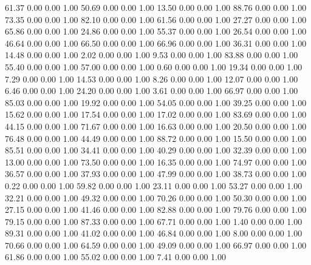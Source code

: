    61.37   0.00   0.00   1.00
   50.69   0.00   0.00   1.00
   13.50   0.00   0.00   1.00
   88.76   0.00   0.00   1.00
   73.35   0.00   0.00   1.00
   82.10   0.00   0.00   1.00
   61.56   0.00   0.00   1.00
   27.27   0.00   0.00   1.00
   65.86   0.00   0.00   1.00
   24.86   0.00   0.00   1.00
   55.37   0.00   0.00   1.00
   26.54   0.00   0.00   1.00
   46.64   0.00   0.00   1.00
   66.50   0.00   0.00   1.00
   66.96   0.00   0.00   1.00
   36.31   0.00   0.00   1.00
   14.48   0.00   0.00   1.00
    2.02   0.00   0.00   1.00
    9.53   0.00   0.00   1.00
   83.88   0.00   0.00   1.00
   55.40   0.00   0.00   1.00
   57.00   0.00   0.00   1.00
    0.60   0.00   0.00   1.00
   19.34   0.00   0.00   1.00
    7.29   0.00   0.00   1.00
   14.53   0.00   0.00   1.00
    8.26   0.00   0.00   1.00
   12.07   0.00   0.00   1.00
    6.46   0.00   0.00   1.00
   24.20   0.00   0.00   1.00
    3.61   0.00   0.00   1.00
   66.97   0.00   0.00   1.00
   85.03   0.00   0.00   1.00
   19.92   0.00   0.00   1.00
   54.05   0.00   0.00   1.00
   39.25   0.00   0.00   1.00
   15.62   0.00   0.00   1.00
   17.54   0.00   0.00   1.00
   17.02   0.00   0.00   1.00
   83.69   0.00   0.00   1.00
   44.15   0.00   0.00   1.00
   71.67   0.00   0.00   1.00
   16.63   0.00   0.00   1.00
   20.50   0.00   0.00   1.00
   76.48   0.00   0.00   1.00
   44.49   0.00   0.00   1.00
   88.72   0.00   0.00   1.00
   15.50   0.00   0.00   1.00
   85.51   0.00   0.00   1.00
   34.41   0.00   0.00   1.00
   40.29   0.00   0.00   1.00
   32.39   0.00   0.00   1.00
   13.00   0.00   0.00   1.00
   73.50   0.00   0.00   1.00
   16.35   0.00   0.00   1.00
   74.97   0.00   0.00   1.00
   36.57   0.00   0.00   1.00
   37.93   0.00   0.00   1.00
   47.99   0.00   0.00   1.00
   38.73   0.00   0.00   1.00
    0.22   0.00   0.00   1.00
   59.82   0.00   0.00   1.00
   23.11   0.00   0.00   1.00
   53.27   0.00   0.00   1.00
   32.21   0.00   0.00   1.00
   49.32   0.00   0.00   1.00
   70.26   0.00   0.00   1.00
   50.30   0.00   0.00   1.00
   27.15   0.00   0.00   1.00
   41.46   0.00   0.00   1.00
   82.88   0.00   0.00   1.00
   79.76   0.00   0.00   1.00
   79.15   0.00   0.00   1.00
   87.33   0.00   0.00   1.00
   67.71   0.00   0.00   1.00
    1.40   0.00   0.00   1.00
   89.31   0.00   0.00   1.00
   41.02   0.00   0.00   1.00
   46.84   0.00   0.00   1.00
    8.00   0.00   0.00   1.00
   70.66   0.00   0.00   1.00
   64.59   0.00   0.00   1.00
   49.09   0.00   0.00   1.00
   66.97   0.00   0.00   1.00
   61.86   0.00   0.00   1.00
   55.02   0.00   0.00   1.00
    7.41   0.00   0.00   1.00
